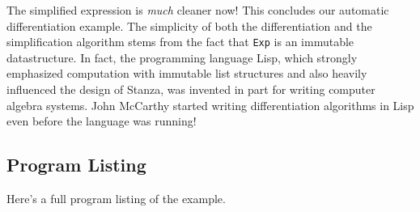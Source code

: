 \documentclass[10pt,oneside]{book}
\begin{document}
The simplified expression is {\em much} cleaner now! This concludes our automatic differentiation example. The simplicity of both the differentiation and the simplification algorithm stems from the fact that \texttt{\frenchspacing Exp} is an immutable datastructure. In fact, the programming language Lisp, which strongly emphasized computation with immutable list structures and also heavily influenced the design of Stanza, was invented in part for writing computer algebra systems. John McCarthy started writing differentiation algorithms in Lisp even before the language was running!

\subsection*{Program Listing}
Here's a full program listing of the example. 
\end{document}
